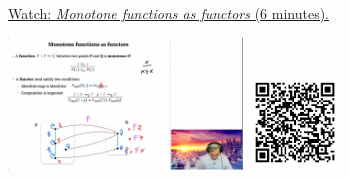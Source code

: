 
\begin{minipage}{10cm}
    \href{https://act4e-spring21.netlify.app/videos/spring2021-functors:semi-and-fun:mon-functions:mon-fun-as-func.html}{Watch: \emph{Monotone functions as functors} (6 minutes).}
        
    \href{https://act4e-spring21.netlify.app/videos/spring2021-functors:semi-and-fun:mon-functions:mon-fun-as-func.html}{\includegraphics[height=3.5cm]{spring2021-functors:semi-and-fun:mon-functions:mon-fun-as-func/thumbnails.jpg}}
    \href{https://act4e-spring21.netlify.app/videos/spring2021-functors:semi-and-fun:mon-functions:mon-fun-as-func.html}{\includegraphics[height=2.5cm]{spring2021-functors:semi-and-fun:mon-functions:mon-fun-as-func/qrcode.png}}
\end{minipage}

